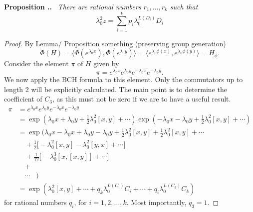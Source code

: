 \documentclass[honours]{UNSWthesis}
\newcommand{\1}{\mathbf{e}_{1}}
\newcommand{\2}{\mathbf{e}_{3}}
\newcommand{\3}{\mathbf{e}_{3}}
\newcounter{Item}[section]
\newenvironment{Proposition}{\medskip
                            \refstepcounter{Item}
                            \noindent
                           {\bf Proposition \thesection.\theItem.}\ %
                            \begingroup \sl}
                           {\endgroup\medskip}
\begin{document}
\begin{Proposition}
There are rational numbers $r_1,\ldots,r_k$ such that 
\[
\lambda_0^2 z= \sum\limits_{i=1}^{k} p_i \lambda_0^{L(D_{i})}D_i
\]
\end{Proposition}
\begin{proof}
By Lemma/ Proposition something (preserving group generation) 
\[
\Phi(H) =\langle \Phi(e^{\lambda_0 x}), \Phi(e^{\lambda_0 y})\rangle =\langle e^{\lambda_0 \phi(x)}, e^{\lambda_0 \phi(y)} \rangle =H_{\phi}.
\]
Consider the element $\pi$ of $H$ given by 
\[
\pi = e^{\lambda_{0} x}e^{\lambda_{0} y}e^{-\lambda_{0} x}e^{-\lambda_{0}y}.
\]
We now apply the BCH formula to this element. Only the commutators up to length 2 will be explicitly calculated. The main point is to determine the coefficient of $C_3$, as this must not be zero if we are to have a useful result.
\begin{align*}
\pi &= e^{\lambda_{0} x}e^{\lambda_{0} y}e^{-\lambda_{0} x}e^{-\lambda_{0}y} \\
&= \exp \left( \lambda_{0} x+\lambda_{0} y + \frac{1}{2}\lambda_{0}^2[ x, y] + \cdots \right) \exp \left(- \lambda_{0} x-\lambda_{0} y + \frac{1}{2}\lambda_{0}^2[ x, y] + \cdots\right) \\
&= \exp \bigg(\lambda_0 x-\lambda_0 x +\lambda_0 y-\lambda_0 y+ \frac{1}{2}\lambda_{0}^2[ x, y]+ \frac{1}{2}\lambda_{0}^2[ x, y]+\cdots \\
& \quad +\frac{1}{2} \big[-\lambda_0^2[x,y]-\lambda_0^2[y,x]+\cdots \big]\\
& \quad +\frac{1}{12}\big[ -\lambda_0^3[x,[x,y]] +\cdots \big] \\
& \quad + \\
& \quad \cdots  \;\;\; \bigg) \\
&= \exp \left( \lambda_0^2 [x,y] + \cdots + q_k \lambda_0^{L(C_i)} C_i +\cdots + q_i \lambda_0^{L(C_k)} C_k \right)
\end{align*}
for rational numbers $q_i$, for $i=1,2,\ldots, k$. Most importantly, $q_3=1$.


\end{proof}
\end{document}
